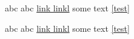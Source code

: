 \documentclass{article}
\begin{document}
 \leavevmode
   abc\label{test}
  \tagmcend
   abc
  \tagmcend 
   \href{www.dante.de}{link linkl}
   some text 
  \tagmcend 
   \ref{test}
 \tagstructend %
 
   abc\label{test}
  \tagmcend
   abc
   \href{www.dante.de}{link linkl}
   some text
   \ref{test}
 \tagstructend %
\tagstructend %
\end{document}
